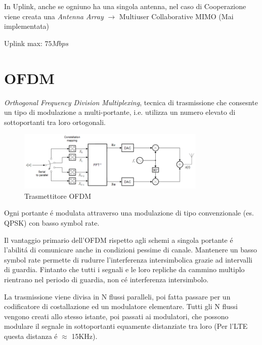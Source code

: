 \documentclass{article}
\begin{document}
%


In Uplink, anche se ogniuno ha una singola antenna, nel caso di Cooperazione viene creata una \textit{Antenna Array} $\rightarrow$ Multiuser Collaborative MIMO (Mai implementata)

Uplink max: $75Mbps$




\section{OFDM}
\textit{Orthogonal Frequency Division Multiplexing}, tecnica di trasmissione che consesnte un tipo di modulazione a multi-portante, i.e. utilizza un numero elevato di sottoportanti tra loro ortogonali.

\begin{figure}[h]
    \includegraphics[width=0.8\textwidth]{img/sdt/ofdm_transmitter}
    \centering
    \caption{Trasmettitore OFDM}
\end{figure}

Ogni portante \'e modulata attraverso una modulazione di tipo convenzionale (es. QPSK) con basso symbol rate.

Il vantaggio primario dell'OFDM rispetto agli schemi a singola portante \'e l'abilit\'a di comunicare anche in condizioni pessime di canale. Mantenere un basso symbol rate permette di rudurre l'interferenza intersimbolica grazie ad intervalli di guardia. Fintanto che tutti i segnali e le loro repliche da cammino multiplo rientrano  nel periodo di guardia, non c\'e interferenza intersimbolo.

La trasmissione viene divisa in N flussi paralleli, poi fatta passare per un codificatore di costallazione ed un modulatore elementare.
Tutti gli N flussi vengono creati allo stesso istante, poi passati ai modulatori, che possono modulare il segnale in sottoportanti equamente distanziate tra loro (Per l'LTE questa distanza \'e $\approx$ 15KHz).
\end{document}
